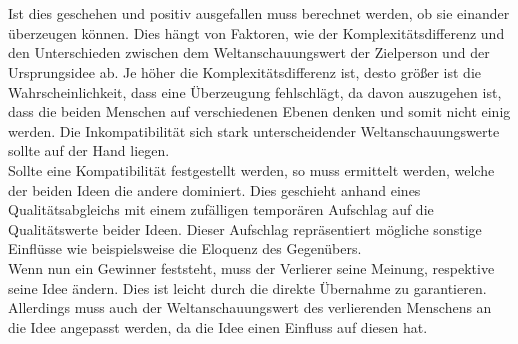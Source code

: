 \quad \\ \quad \\
Ist dies geschehen und positiv ausgefallen muss berechnet werden, ob sie einander überzeugen können.
Dies hängt von Faktoren, wie der Komplexitätsdifferenz und den Unterschieden zwischen dem Weltanschauungswert der Zielperson und der Ursprungsidee ab. Je höher die Komplexitätsdifferenz ist, desto größer ist die Wahrscheinlichkeit, dass eine Überzeugung fehlschlägt, da davon auszugehen ist, dass die beiden Menschen auf verschiedenen Ebenen denken und somit nicht einig werden. Die Inkompatibilität sich stark unterscheidender Weltanschauungswerte sollte auf der Hand liegen. \\
Sollte eine Kompatibilität festgestellt werden, so muss ermittelt werden, welche der beiden Ideen die andere dominiert. Dies geschieht anhand eines Qualitätsabgleichs mit einem zufälligen temporären Aufschlag auf die Qualitätswerte beider Ideen. Dieser Aufschlag repräsentiert mögliche sonstige Einflüsse wie beispielsweise die Eloquenz des Gegenübers. \\
Wenn nun ein Gewinner feststeht, muss der Verlierer seine Meinung, respektive seine Idee ändern. Dies ist leicht durch die direkte Übernahme zu garantieren. Allerdings muss auch der Weltanschauungswert des verlierenden Menschens an die Idee angepasst werden, da die Idee einen Einfluss auf diesen hat. \\

